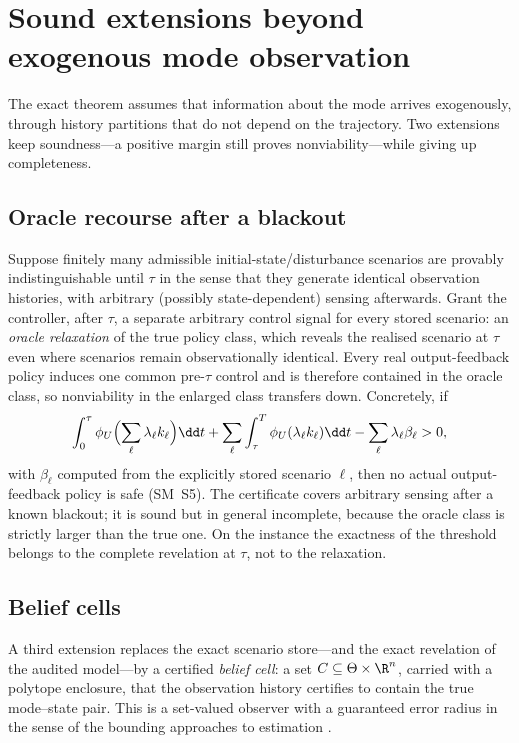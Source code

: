 \section{Sound extensions beyond exogenous mode observation}\label{sec:extensions}

The exact theorem assumes that information about the mode arrives exogenously, through history partitions that do not depend on the trajectory. Two extensions keep soundness---a positive margin still proves nonviability---while giving up completeness.

\subsection{Oracle recourse after a blackout}

Suppose finitely many admissible initial-state/disturbance scenarios are provably indistinguishable until $\tau$ in the sense that they generate identical observation histories, with arbitrary (possibly state-dependent) sensing afterwards. Grant the controller, after $\tau$, a separate arbitrary control signal for every stored scenario: an \emph{oracle relaxation} of the true policy class, which reveals the realised scenario at $\tau$ even where scenarios remain observationally identical. Every real output-feedback policy induces one common pre-$\tau$ control and is therefore contained in the oracle class, so nonviability in the enlarged class transfers down. Concretely, if
\begin{equation}\label{eq:oracle}
\int_0^\tau\phi_U\Bigl(\sum_\ell\lambda_\ell k_\ell\Bigr)\dd t+\sum_\ell\int_\tau^T\phi_U(\lambda_\ell k_\ell)\dd t-\sum_\ell\lambda_\ell\beta_\ell>0 ,
\end{equation}
with $\beta_\ell$ computed from the explicitly stored scenario $\ell$, then no actual output-feedback policy is safe (SM~S5). The certificate covers arbitrary sensing after a known blackout; it is sound but in general incomplete, because the oracle class is strictly larger than the true one. On the instance the exactness of the threshold belongs to the complete revelation at $\tau$, not to the relaxation.

\subsection{Belief cells}

A third extension replaces the exact scenario store---and the exact revelation of the audited model---by a certified \emph{belief cell}: a set $C\subseteq\Theta\times\R^n$, carried with a polytope enclosure, that the observation history certifies to contain the true mode--state pair. This is a set-valued observer with a guaranteed error radius in the sense of the bounding approaches to estimation \cite{Witsenhausen1968,Milanese1996}.

